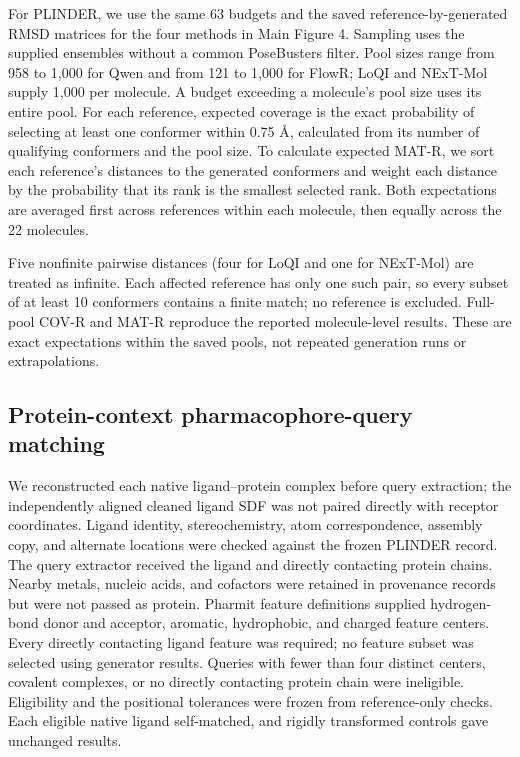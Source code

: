 For PLINDER, we use the same 63 budgets and the saved reference-by-generated RMSD
matrices for the four methods in Main Figure 4. Sampling uses the supplied
ensembles without a common PoseBusters filter. Pool sizes range from 958 to 1,000
for Qwen and from 121 to 1,000 for FlowR; LoQI and NExT-Mol supply 1,000 per molecule.
A budget exceeding a molecule's pool size uses its entire pool. For each reference,
expected coverage is the exact probability of selecting at least one conformer
within 0.75 \AA{}, calculated from its number of qualifying conformers and the pool
size. To calculate expected MAT-R, we sort each reference's distances to the generated
conformers and weight each distance by the probability that its rank is the smallest
selected rank. Both expectations are averaged first across references within each
molecule, then equally across the 22 molecules.

Five nonfinite pairwise distances (four for LoQI and one for NExT-Mol) are treated
as infinite. Each affected reference has only one such pair, so every subset of at
least 10 conformers contains a finite match; no reference is excluded. Full-pool
COV-R and MAT-R reproduce the reported molecule-level results. These are exact
expectations within the saved pools, not repeated generation runs or extrapolations.

\subsection*{Protein-context pharmacophore-query matching}

We reconstructed each native ligand--protein complex before query extraction; the
independently aligned cleaned ligand SDF was not paired directly with receptor
coordinates. Ligand identity, stereochemistry, atom correspondence, assembly copy,
and alternate locations were checked against the frozen PLINDER record. The query
extractor received the ligand and directly contacting protein chains. Nearby metals,
nucleic acids, and cofactors were retained in provenance records but were not passed
as protein. Pharmit feature definitions\cite{sunseri2016pharmit} supplied hydrogen-bond
donor and acceptor, aromatic, hydrophobic, and charged feature centers. Every directly
contacting ligand feature was required; no feature subset was selected using generator
results. Queries with fewer than four distinct centers, covalent complexes, or no
directly contacting protein chain were ineligible. Eligibility and the positional
tolerances were frozen from reference-only checks. Each eligible native ligand
self-matched, and rigidly transformed controls gave unchanged results.

